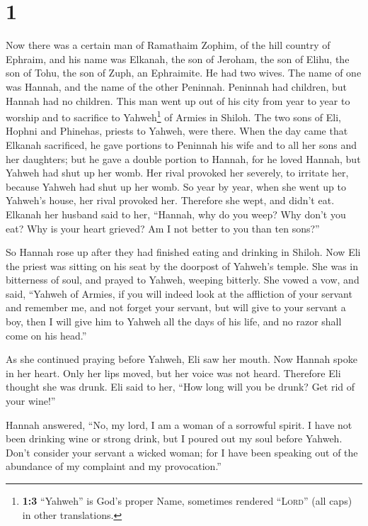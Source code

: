 \hypertarget{section}{%
\section{1}\label{section}}

 Now there was a certain man of Ramathaim Zophim, of the
hill country of Ephraim, and his name was Elkanah, the son of Jeroham,
the son of Elihu, the son of Tohu, the son of Zuph, an Ephraimite.
 He had two wives. The name of one was Hannah, and the
name of the other Peninnah. Peninnah had children, but Hannah had no
children.  This man went up out of his city from year to
year to worship and to sacrifice to Yahweh\footnote{\textbf{1:3}
  ``Yahweh'' is God's proper Name, sometimes rendered ``\textsc{Lord}''
  (all caps) in other translations.} of Armies in Shiloh. The two sons
of Eli, Hophni and Phinehas, priests to Yahweh, were there.
 When the day came that Elkanah sacrificed, he gave
portions to Peninnah his wife and to all her sons and her daughters;
 but he gave a double portion to Hannah, for he loved
Hannah, but Yahweh had shut up her womb.  Her rival
provoked her severely, to irritate her, because Yahweh had shut up her
womb.  So year by year, when she went up to Yahweh's
house, her rival provoked her. Therefore she wept, and didn't eat.
 Elkanah her husband said to her, ``Hannah, why do you
weep? Why don't you eat? Why is your heart grieved? Am I not better to
you than ten sons?''

 So Hannah rose up after they had finished eating and
drinking in Shiloh. Now Eli the priest was sitting on his seat by the
doorpost of Yahweh's temple.  She was in bitterness of
soul, and prayed to Yahweh, weeping bitterly.  She vowed
a vow, and said, ``Yahweh of Armies, if you will indeed look at the
affliction of your servant and remember me, and not forget your servant,
but will give to your servant a boy, then I will give him to Yahweh all
the days of his life, and no razor shall come on his head.''

 As she continued praying before Yahweh, Eli saw her
mouth.  Now Hannah spoke in her heart. Only her lips
moved, but her voice was not heard. Therefore Eli thought she was drunk.
 Eli said to her, ``How long will you be drunk? Get rid
of your wine!''

 Hannah answered, ``No, my lord, I am a woman of a
sorrowful spirit. I have not been drinking wine or strong drink, but I
poured out my soul before Yahweh.  Don't consider your
servant a wicked woman; for I have been speaking out of the abundance of
my complaint and my provocation.''

